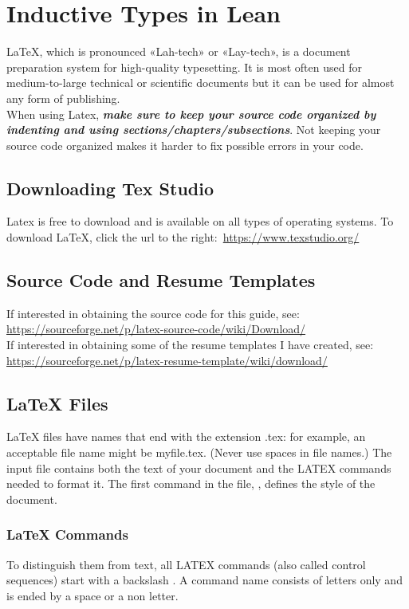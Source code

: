 \section{Inductive Types in Lean}
\vspace{10.5cm}
	LaTeX, which is pronounced «Lah-tech» or «Lay-tech», is a document preparation system for high-quality typesetting. It is most often used for medium-to-large technical or scientific documents but it can be used for almost any form of publishing.\\
	When using Latex, \textbf{\emph{make sure to keep your source code organized by indenting and using sections/chapters/subsections}}. Not keeping your source code organized makes it harder to fix possible errors in your code.
	\subsection{Downloading Tex Studio}
			Latex is free to download and is available on all types of operating systems. To download \LaTeX, click the url to the right:\, \url{https://www.texstudio.org/}
	\subsection{Source Code and Resume Templates}
			If interested in obtaining the source code for this guide, see:\\
			\url{https://sourceforge.net/p/latex-source-code/wiki/Download/}\\
			If interested in obtaining some of the resume templates I have created, see:\\ \url{https://sourceforge.net/p/latex-resume-template/wiki/download/}
	\subsection{LaTeX Files}
			LaTeX files have names that end with the extension .tex: for example, an acceptable file name might be myfile.tex. (Never use spaces in file names.) The input file contains both the text of your document and the LATEX commands needed to format it. The first command in the file, , defines the style of the document.
	\subsubsection{LaTeX Commands}
			To distinguish them from text, all LATEX commands (also called control sequences) start with a backslash \cs. A command name consists of letters only and is ended by a space or a non letter.
